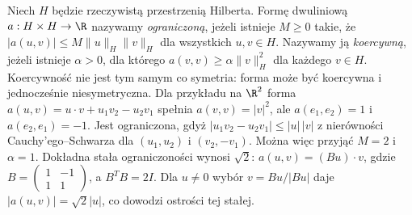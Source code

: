 \begin{definicja}
\label{def:pde11-coercivity}
Niech $H$ będzie rzeczywistą przestrzenią Hilberta.
Formę dwuliniową $a:H\times H\to\R$ nazywamy
\emph{ograniczoną}, jeżeli istnieje $M\ge0$ takie, że
$|a(u,v)|\le M\|u\|_H\|v\|_H$ dla wszystkich $u,v\in H$.
Nazywamy ją \emph{koercywną}, jeżeli istnieje $\alpha>0$,
dla którego $a(v,v)\ge\alpha\|v\|_H^2$ dla każdego $v\in H$.
Koercywność nie jest tym samym co symetria: forma
może być koercywna i jednocześnie niesymetryczna.
Dla przykładu na $\R^2$ forma
$a(u,v)=u\cdot v+u_1v_2-u_2v_1$ spełnia
$a(v,v)=|v|^2$, ale $a(e_1,e_2)=1$ i $a(e_2,e_1)=-1$.
Jest ograniczona, gdyż
$|u_1v_2-u_2v_1|\le |u|\,|v|$ z nierówności
Cauchy'ego--Schwarza dla $(u_1,u_2)$ i $(v_2,-v_1)$.
Można więc przyjąć $M=2$ i $\alpha=1$.
Dokładna stała ograniczoności wynosi $\sqrt2$:
$a(u,v)=(Bu)\cdot v$, gdzie
$B=\begin{pmatrix}1&-1\\1&1\end{pmatrix}$, a $B^TB=2I$.
Dla $u\ne0$ wybór $v=Bu/|Bu|$ daje
$|a(u,v)|=\sqrt2|u|$, co dowodzi ostrości tej stałej.
\end{definicja}

